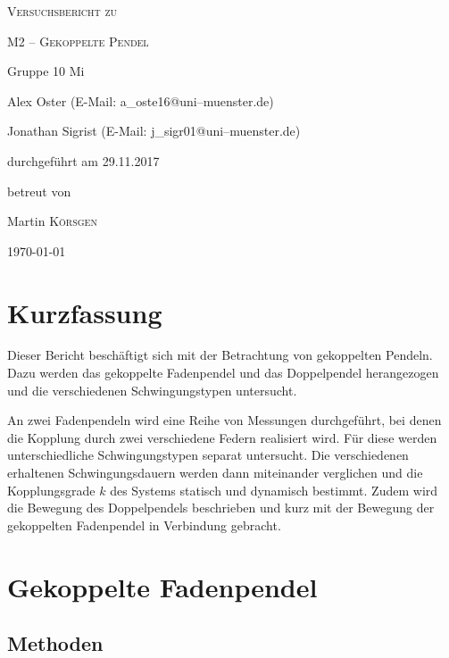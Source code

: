 \documentclass[11pt,a4paper,titlepage, ngerman]{article}
\begin{document}
	\begin{titlepage}
		\centering
		{\scshape\LARGE Versuchsbericht zu \par}
		\vspace{1cm}
		{\scshape\huge M2 -- Gekoppelte Pendel\par}
		\vspace{2.5cm}
		{\LARGE Gruppe 10 Mi\par}
		\vspace{0.5cm}
		{\large Alex Oster (E-Mail: a\_oste16@uni--muenster.de) \par}
		{\large Jonathan Sigrist (E-Mail: j\_sigr01@uni--muenster.de) \par}
		\vfill
		durchgeführt am 29.11.2017\par
		betreut von\par
		{\large Martin \textsc{Körsgen}}		
		\vfill	
		{\large \today\par}
	\end{titlepage}
		
	\tableofcontents
		
	\newpage
	
	\section{Kurzfassung}
		
		Dieser Bericht beschäftigt sich mit der Betrachtung von gekoppelten Pendeln. Dazu werden das gekoppelte Fadenpendel und das Doppelpendel herangezogen und die verschiedenen Schwingungstypen untersucht.
		
		An zwei Fadenpendeln wird eine Reihe von Messungen durchgeführt, bei denen die Kopplung durch zwei verschiedene Federn realisiert wird. Für diese werden unterschiedliche Schwingungstypen separat untersucht. Die verschiedenen erhaltenen Schwingungsdauern werden dann miteinander verglichen und die Kopplungsgrade $k$ des Systems statisch und dynamisch bestimmt. Zudem wird die Bewegung des Doppelpendels beschrieben und kurz mit der Bewegung der gekoppelten Fadenpendel in Verbindung gebracht.
	
	\vspace{2cm}	
	\section{Gekoppelte Fadenpendel}
		
		\subsection{Methoden}
			
\end{document}
